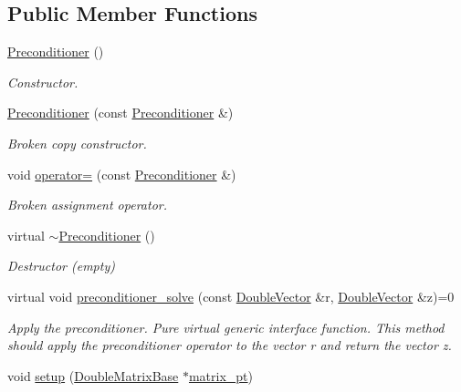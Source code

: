 \subsection*{Public Member Functions}
\begin{DoxyCompactItemize}
\item 
\hyperlink{classoomph_1_1Preconditioner_a7bd8801e4395ccb88fe1f4296e77e9ab}{Preconditioner} ()
\begin{DoxyCompactList}\small\item\em Constructor. \end{DoxyCompactList}\item 
\hyperlink{classoomph_1_1Preconditioner_ab1bf593b1c36c215423bbdb5a360388a}{Preconditioner} (const \hyperlink{classoomph_1_1Preconditioner}{Preconditioner} \&)
\begin{DoxyCompactList}\small\item\em Broken copy constructor. \end{DoxyCompactList}\item 
void \hyperlink{classoomph_1_1Preconditioner_a0f853396c6275cc9bc31ecd9d148d112}{operator=} (const \hyperlink{classoomph_1_1Preconditioner}{Preconditioner} \&)
\begin{DoxyCompactList}\small\item\em Broken assignment operator. \end{DoxyCompactList}\item 
virtual \hyperlink{classoomph_1_1Preconditioner_ab60952a82cc1b6b91fff5924eaa62c0e}{$\sim$\+Preconditioner} ()
\begin{DoxyCompactList}\small\item\em Destructor (empty) \end{DoxyCompactList}\item 
virtual void \hyperlink{classoomph_1_1Preconditioner_ace1199369e4465cd2b9a34884bb64ec8}{preconditioner\+\_\+solve} (const \hyperlink{classoomph_1_1DoubleVector}{Double\+Vector} \&r, \hyperlink{classoomph_1_1DoubleVector}{Double\+Vector} \&z)=0
\begin{DoxyCompactList}\small\item\em Apply the preconditioner. Pure virtual generic interface function. This method should apply the preconditioner operator to the vector r and return the vector z. \end{DoxyCompactList}\item 
void \hyperlink{classoomph_1_1Preconditioner_a0b95e7159585b5151f9e5dc1d1713655}{setup} (\hyperlink{classoomph_1_1DoubleMatrixBase}{Double\+Matrix\+Base} $\ast$\hyperlink{classoomph_1_1Preconditioner_a66726e9df31365df646cdf83a975aa26}{matrix\+\_\+pt})

\end{DoxyCompactItemize}
